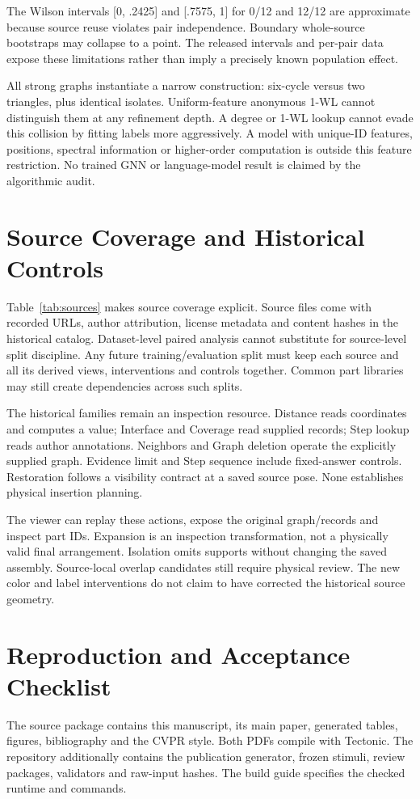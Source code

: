 \documentclass[10pt,twocolumn,letterpaper]{article}
\begin{document}
The Wilson intervals [0, .2425] and [.7575, 1] for 0/12 and 12/12
are approximate because source reuse violates pair independence.
Boundary whole-source bootstraps may collapse to a point. The
released intervals and per-pair data expose these limitations rather
than imply a precisely known population effect.

All strong graphs instantiate a narrow construction: six-cycle
versus two triangles, plus identical isolates. Uniform-feature
anonymous 1-WL cannot distinguish them at any refinement depth.
A degree or 1-WL lookup cannot evade this collision by fitting labels
more aggressively. A model with unique-ID features, positions,
spectral information or higher-order computation is outside this
feature restriction. No trained GNN or language-model result is
claimed by the algorithmic audit.

\section{Source Coverage and Historical Controls}
Table~\ref{tab:sources} makes source coverage explicit. Source files
come with recorded URLs, author attribution, license metadata and
content hashes in the historical catalog. Dataset-level paired
analysis cannot substitute for source-level split discipline.
Any future training/evaluation split must keep each source and all
its derived views, interventions and controls together. Common part
libraries may still create dependencies across such splits.

The historical families remain an inspection resource. Distance
reads coordinates and computes a value; Interface and Coverage
read supplied records; Step lookup reads author annotations.
Neighbors and Graph deletion operate the explicitly supplied graph.
Evidence limit and Step sequence include fixed-answer controls.
Restoration follows a visibility contract at a saved source pose.
None establishes physical insertion planning.

The viewer can replay these actions, expose the original graph/records
and inspect part IDs. Expansion is an inspection transformation,
not a physically valid final arrangement. Isolation omits supports
without changing the saved assembly. Source-local overlap candidates
still require physical review. The new color and label interventions
do not claim to have corrected the historical source geometry.

\section{Reproduction and Acceptance Checklist}
The source package contains this manuscript, its main paper, generated
tables, figures, bibliography and the CVPR style. Both PDFs compile
with Tectonic. The repository additionally contains the publication
generator, frozen stimuli, review packages, validators and raw-input
hashes. The build guide specifies the checked runtime and commands.
\end{document}
